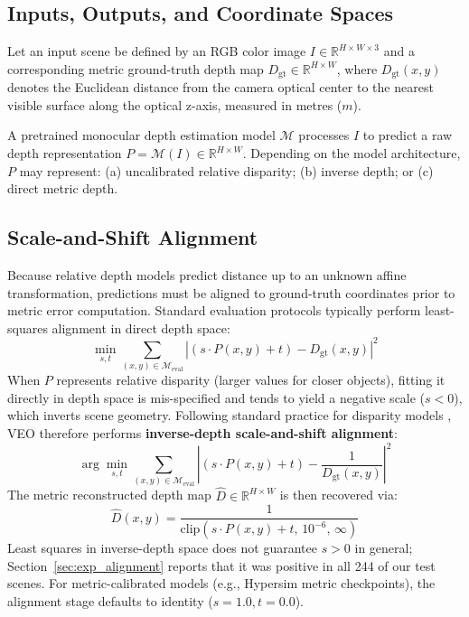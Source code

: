 \documentclass[11pt,a4paper]{article}
\begin{document}
\subsection{Inputs, Outputs, and Coordinate Spaces}
Let an input scene be defined by an RGB color image $I \in \mathbb{R}^{H \times W \times 3}$ and a corresponding metric ground-truth depth map $D_{\mathrm{gt}} \in \mathbb{R}^{H \times W}$, where $D_{\mathrm{gt}}(x,y)$ denotes the Euclidean distance from the camera optical center to the nearest visible surface along the optical z-axis, measured in metres ($m$).

A pretrained monocular depth estimation model $\mathcal{M}$ processes $I$ to predict a raw depth representation $P = \mathcal{M}(I) \in \mathbb{R}^{H \times W}$. Depending on the model architecture, $P$ may represent: (a) uncalibrated relative disparity; (b) inverse depth; or (c) direct metric depth.

\subsection{Scale-and-Shift Alignment}
\label{sec:alignment}
Because relative depth models predict distance up to an unknown affine transformation, predictions must be aligned to ground-truth coordinates prior to metric error computation. Standard evaluation protocols typically perform least-squares alignment in direct depth space:
\begin{equation}
\label{eq:direct_alignment}
\min_{s, t} \sum_{(x,y) \in \mathcal{M}_{\mathrm{eval}}} \left| \left( s \cdot P(x,y) + t \right) - D_{\mathrm{gt}}(x,y) \right|^2
\end{equation}
When $P$ represents relative disparity (larger values for closer objects), fitting it directly in depth space is mis-specified and tends to yield a negative scale ($s < 0$), which inverts scene geometry. Following standard practice for disparity models \citep{ranftl2022towards}, VEO therefore performs \textbf{inverse-depth scale-and-shift alignment}:
\begin{equation}
\label{eq:inverse_alignment}
\arg\min_{s, t} \sum_{(x,y) \in \mathcal{M}_{\mathrm{eval}}} \left| \left( s \cdot P(x,y) + t \right) - \frac{1}{D_{\mathrm{gt}}(x,y)} \right|^2
\end{equation}
The metric reconstructed depth map $\hat{D} \in \mathbb{R}^{H \times W}$ is then recovered via:
\begin{equation}
\label{eq:metric_recovery}
\hat{D}(x,y) = \frac{1}{\text{clip}\left( s \cdot P(x,y) + t, \, 10^{-6}, \, \infty \right)}
\end{equation}
Least squares in inverse-depth space does not guarantee $s > 0$ in general; Section~\ref{sec:exp_alignment} reports that it was positive in all 244 of our test scenes. For metric-calibrated models (e.g., Hypersim metric checkpoints), the alignment stage defaults to identity ($s = 1.0, t = 0.0$).
\end{document}
